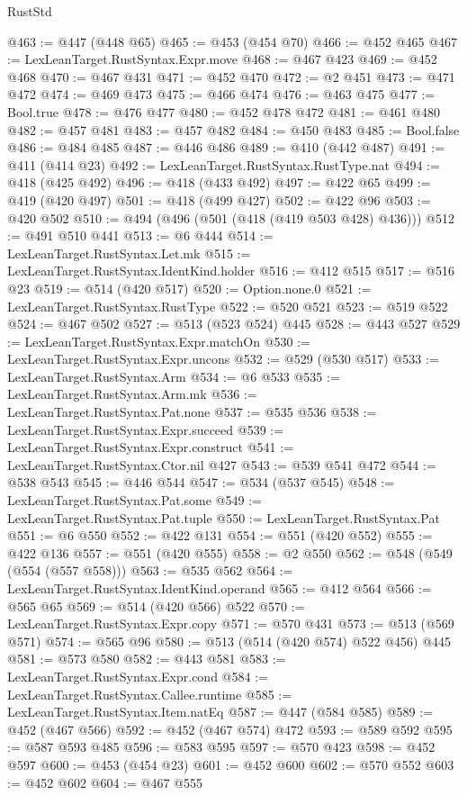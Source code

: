 \begin{lexlean}{RustStd}
\begin{coremodule}
@463 := @447 (@448 @65)
@465 := @453 (@454 @70)
@466 := @452 @465
@467 := LexLeanTarget.RustSyntax.Expr.move
@468 := @467 @423
@469 := @452 @468
@470 := @467 @431
@471 := @452 @470
@472 := @2 @451
@473 := @471 @472
@474 := @469 @473
@475 := @466 @474
@476 := @463 @475
@477 := Bool.true
@478 := @476 @477
@480 := @452 @478 @472
@481 := @461 @480
@482 := @457 @481
@483 := @457 @482
@484 := @450 @483
@485 := Bool.false
@486 := @484 @485
@487 := @446 @486
@489 := @410 (@442 @487)
@491 := @411 (@414 @23)
@492 := LexLeanTarget.RustSyntax.RustType.nat
@494 := @418 (@425 @492)
@496 := @418 (@433 @492)
@497 := @422 @65
@499 := @419 (@420 @497)
@501 := @418 (@499 @427)
@502 := @422 @96
@503 := @420 @502
@510 := @494 (@496 (@501 (@418 (@419 @503 @428) @436)))
@512 := @491 @510 @441
@513 := @6 @444
@514 := LexLeanTarget.RustSyntax.Let.mk
@515 := LexLeanTarget.RustSyntax.IdentKind.holder
@516 := @412 @515
@517 := @516 @23
@519 := @514 (@420 @517)
@520 := Option.none.{0}
@521 := LexLeanTarget.RustSyntax.RustType
@522 := @520 @521
@523 := @519 @522
@524 := @467 @502
@527 := @513 (@523 @524) @445
@528 := @443 @527
@529 := LexLeanTarget.RustSyntax.Expr.matchOn
@530 := LexLeanTarget.RustSyntax.Expr.uncons
@532 := @529 (@530 @517)
@533 := LexLeanTarget.RustSyntax.Arm
@534 := @6 @533
@535 := LexLeanTarget.RustSyntax.Arm.mk
@536 := LexLeanTarget.RustSyntax.Pat.none
@537 := @535 @536
@538 := LexLeanTarget.RustSyntax.Expr.succeed
@539 := LexLeanTarget.RustSyntax.Expr.construct
@541 := LexLeanTarget.RustSyntax.Ctor.nil @427
@543 := @539 @541 @472
@544 := @538 @543
@545 := @446 @544
@547 := @534 (@537 @545)
@548 := LexLeanTarget.RustSyntax.Pat.some
@549 := LexLeanTarget.RustSyntax.Pat.tuple
@550 := LexLeanTarget.RustSyntax.Pat
@551 := @6 @550
@552 := @422 @131
@554 := @551 (@420 @552)
@555 := @422 @136
@557 := @551 (@420 @555)
@558 := @2 @550
@562 := @548 (@549 (@554 (@557 @558)))
@563 := @535 @562
@564 := LexLeanTarget.RustSyntax.IdentKind.operand
@565 := @412 @564
@566 := @565 @65
@569 := @514 (@420 @566) @522
@570 := LexLeanTarget.RustSyntax.Expr.copy
@571 := @570 @431
@573 := @513 (@569 @571)
@574 := @565 @96
@580 := @513 (@514 (@420 @574) @522 @456) @445
@581 := @573 @580
@582 := @443 @581
@583 := LexLeanTarget.RustSyntax.Expr.cond
@584 := LexLeanTarget.RustSyntax.Callee.runtime
@585 := LexLeanTarget.RustSyntax.Item.natEq
@587 := @447 (@584 @585)
@589 := @452 (@467 @566)
@592 := @452 (@467 @574) @472
@593 := @589 @592
@595 := @587 @593 @485
@596 := @583 @595
@597 := @570 @423
@598 := @452 @597
@600 := @453 (@454 @23)
@601 := @452 @600
@602 := @570 @552
@603 := @452 @602
@604 := @467 @555

\end{coremodule}
\end{lexlean}
